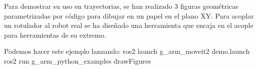 Para demostrar su uso en trayectorias, se han realizado 3 figuras geométricas parametrizadas por código para dibujar en un papel en el plano XY. Para acoplar 
un rotulador al robot real se ha diseñado una herramienta que encaja en el acople para herramientas de su extremo.


Podemos hacer este ejemplo lanzando:
ros2 launch g\_arm\_moveit2 demo.launch
ros2 run g\_arm\_python\_examples drawFigures